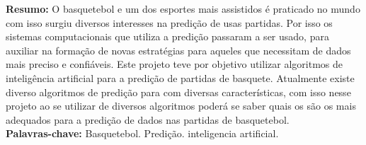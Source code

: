 \begin{singlespace}
\textbf{Resumo:}
O basquetebol e um dos esportes mais assistidos é praticado no mundo com isso surgiu diversos interesses na predição de usas partidas. Por isso os sistemas computacionais que utiliza a predição passaram a ser usado, para auxiliar na formação de novas estratégias para aqueles que necessitam de dados mais preciso e confiáveis. Este projeto teve por objetivo utilizar algoritmos de inteligência artificial para a predição de partidas de basquete. Atualmente existe diverso algoritmos de predição para com diversas características, com isso nesse projeto ao se utilizar de diversos algoritmos poderá se saber quais os são os mais adequados para a predição de dados nas partidas de basquetebol.\\
\textbf{Palavras-chave: }
Basquetebol. Predição. inteligencia artificial.
\end{singlespace}
